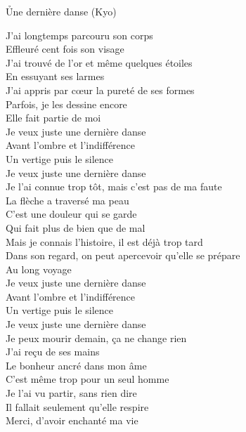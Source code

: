 \documentclass{novel}
\begin{document}
\newpage
\normalsize
\h*{Une dernière danse (Kyo)}

\begin{multicols}{2}
J'ai longtemps parcouru son corps \\
Effleuré cent fois son visage \\
J'ai trouvé de l'or et même quelques étoiles \\
En essuyant ses larmes \\
J'ai appris par cœur la pureté de ses formes \\
Parfois, je les dessine encore \\
Elle fait partie de moi \\

Je veux juste une dernière danse \\
Avant l'ombre et l'indifférence \\
Un vertige puis le silence \\
Je veux juste une dernière danse \\

Je l'ai connue trop tôt, mais c'est pas de ma faute \\
La flèche a traversé ma peau \\
C'est une douleur qui se garde \\
Qui fait plus de bien que de mal \\

Mais je connais l'histoire, il est déjà trop tard \\
Dans son regard, on peut apercevoir qu'elle se prépare \\
Au long voyage \\

Je veux juste une dernière danse \\
Avant l'ombre et l'indifférence \\
Un vertige puis le silence \\
Je veux juste une dernière danse \\

Je peux mourir demain, ça ne change rien \\
J'ai reçu de ses mains \\
Le bonheur ancré dans mon âme \\
C'est même trop pour un seul homme \\

Je l'ai vu partir, sans rien dire \\
Il fallait seulement qu'elle respire \\
Merci, d'avoir enchanté ma vie \\


\end{multicols}
\end{document}
